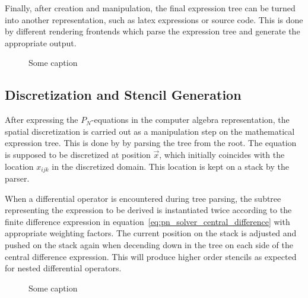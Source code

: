 Finally, after creation and manipulation, the final expression tree can be turned into another representation, such as latex expressions or source code. This is done by different rendering frontends which parse the expression tree and generate the appropriate output.
\begin{figure}[h]
\centering
{}
\caption{Some caption}
\label{fig:pn_math_expression_tree_rendering}
\end{figure}

\subsection{Discretization and Stencil Generation}
\label{sec:pn_stencil_gen}

After expressing the $P_N$-equations in the computer algebra representation, the spatial discretization is carried out as a manipulation step on the mathematical expression tree. This is done by by parsing the tree from the root. The equation is supposed to be discretized at position $\vec{x}$, which initially coincides with the location $x_{ijk}$ in the discretized domain. This location is kept on a stack by the parser.

When a differential operator is encountered during tree parsing, the subtree representing the expression to be derived is instantiated twice according to the finite difference expression in equation~\ref{eq:pn_solver_central_difference} with appropriate weighting factors. The current position on the stack is adjusted and pushed on the stack again when decending down in the tree on each side of the central difference expression. This will produce higher order stencils as expected for nested differential operators.
\begin{figure}[h]
\centering
{}
\caption{Some caption}
\label{fig:pn_discretization_differential}
\end{figure}

